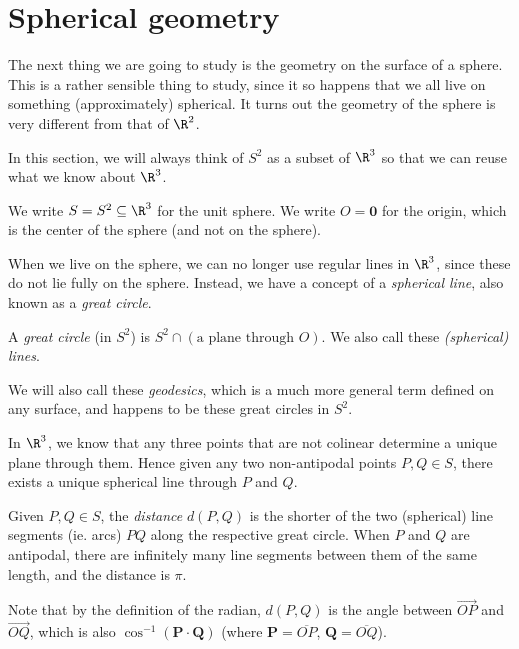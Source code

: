 \documentclass[a4paper]{article}
\begin{document}
\section{Spherical geometry}
The next thing we are going to study is the geometry on the surface of a sphere. This is a rather sensible thing to study, since it so happens that we all live on something (approximately) spherical. It turns out the geometry of the sphere is very different from that of $\R^2$.

In this section, we will always think of $S^2$ as a subset of $\R^3$ so that we can reuse what we know about $\R^3$.
\begin{notation}
  We write $S = S^2 \subseteq \R^3$ for the unit sphere. We write $O = \mathbf{0}$ for the origin, which is the center of the sphere (and not on the sphere).
\end{notation}

When we live on the sphere, we can no longer use regular lines in $\R^3$, since these do not lie fully on the sphere. Instead, we have a concept of a \emph{spherical line}, also known as a \emph{great circle}.
\begin{defi}
  A \emph{great circle} (in $S^2$) is $S^2 \cap (\text{a plane through }O)$. We also call these \emph{(spherical) lines}.
\end{defi}
We will also call these \emph{geodesics}, which is a much more general term defined on any surface, and happens to be these great circles in $S^2$.

In $\R^3$, we know that any three points that are not colinear determine a unique plane through them. Hence given any two non-antipodal points $P, Q \in S$, there exists a unique spherical line through $P$ and $Q$.

\begin{defi}
  Given $P, Q \in S$, the \emph{distance} $d(P, Q)$ is the shorter of the two (spherical) line segments (ie. arcs) $PQ$ along the respective great circle. When $P$ and $Q$ are antipodal, there are infinitely many line segments between them of the same length, and the distance is $\pi$.
\end{defi}
Note that by the definition of the radian, $d(P, Q)$ is the angle between $\overrightarrow{OP}$ and $\overrightarrow{OQ}$, which is also $\cos^{-1}(\mathbf{P}\cdot \mathbf{Q})$ (where $\mathbf{P} = \overline{OP}$, $\mathbf{Q} = \overline{OQ}$).
\end{document}
